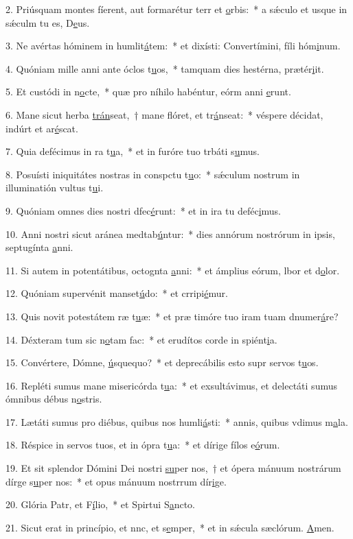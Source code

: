 2. Priúsquam montes fíerent, aut formarétur terr et \uline{o}rbis:~* a sǽculo et usque in sǽculm tu es, D\uline{e}us.\par 
3. Ne avértas hóminem in humlit\uline{á}tem:~* et dixísti: Convertímini, fíli hóm\uline{i}num.\par 
4. Quóniam mille anni ante óclos t\uline{u}os,~* tamquam dies hestérna,  prætér\uline{i}it.\par 
5. Et custódi in n\uline{o}cte,~* quæ pro níhilo habéntur, eórm anni \uline{e}runt.\par 
6. Mane sicut herba \uline{trán}seat,~† mane flóret, et tr\uline{á}nseat:~* véspere décidat, indúrt et ar\uline{é}scat.\par 
7. Quia defécimus in ra t\uline{u}a,~* et in furóre tuo trbáti s\uline{u}mus.\par 
8. Posuísti iniquitátes nostras in conspctu t\uline{u}o:~* sǽculum nostrum in illuminatión vultus t\uline{u}i.\par 
9. Quóniam omnes dies nostri dfec\uline{é}runt:~* et in ira tu deféc\uline{i}mus.\par 
10. Anni nostri sicut aránea medtab\uline{ú}ntur:~* dies annórum nostrórum in ipsis, septugínta \uline{a}nni.\par 
11. Si autem in potentátibus, octognta \uline{a}nni:~* et ámplius eórum, lbor et d\uline{o}lor.\par 
12. Quóniam supervénit manset\uline{ú}do:~* et crripi\uline{é}mur.\par 
13. Quis novit potestátem ræ t\uline{u}æ:~* et præ timóre tuo iram tuam dnumer\uline{á}re?\par 
14. Déxteram tum sic n\uline{o}tam fac:~* et erudítos corde in spiént\uline{i}a.\par 
15. Convértere, Dómne, \uline{ú}squequo?~* et deprecábilis esto supr servos t\uline{u}os.\par 
16. Repléti sumus mane misericórda t\uline{u}a:~* et exsultávimus, et delectáti sumus ómnibus débus n\uline{o}stris.\par 
17. Lætáti sumus pro diébus, quibus nos humli\uline{á}sti:~* annis, quibus vdimus m\uline{a}la.\par 
18. Réspice in servos tuos, et in ópra t\uline{u}a:~* et dírige fílos e\uline{ó}rum.\par 
19. Et sit splendor Dómini Dei nostri \uline{su}per nos,~† et ópera mánuum nostrárum dírge s\uline{u}per nos:~* et opus mánuum nostrrum dír\uline{i}ge.\par 
20. Glória Patr, et F\uline{í}lio,~* et Spirtui S\uline{a}ncto.\par 
21. Sicut erat in princípio, et nnc, et s\uline{e}mper,~* et in sǽcula sæclórum. \uline{A}men.\par 
